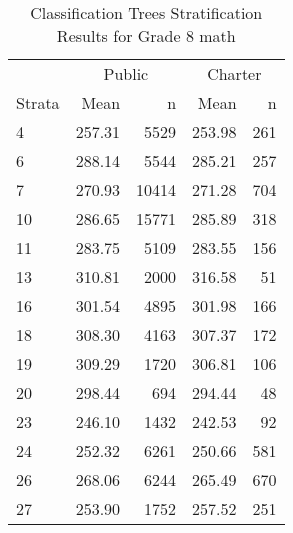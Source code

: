 \begin{table}[ht]
\centering
\caption{Classification Trees Stratification Results for Grade 8 math} 
\label{g8math-circpsa-tree}
\begin{tabular}{lrr@{\extracolsep{.2cm}}rr}
  \hline
   & \multicolumn{2}{c}{Public} & \multicolumn{2}{c}{Charter} \\ \cline{2-3} \cline{4-5} Strata & Mean & n & Mean & n \\ \hline
4 & 257.31 & 5529 & 253.98 & 261 \\ 
  6 & 288.14 & 5544 & 285.21 & 257 \\ 
  7 & 270.93 & 10414 & 271.28 & 704 \\ 
  10 & 286.65 & 15771 & 285.89 & 318 \\ 
  11 & 283.75 & 5109 & 283.55 & 156 \\ 
  13 & 310.81 & 2000 & 316.58 &  51 \\ 
  16 & 301.54 & 4895 & 301.98 & 166 \\ 
  18 & 308.30 & 4163 & 307.37 & 172 \\ 
  19 & 309.29 & 1720 & 306.81 & 106 \\ 
  20 & 298.44 & 694 & 294.44 &  48 \\ 
  23 & 246.10 & 1432 & 242.53 &  92 \\ 
  24 & 252.32 & 6261 & 250.66 & 581 \\ 
  26 & 268.06 & 6244 & 265.49 & 670 \\ 
  27 & 253.90 & 1752 & 257.52 & 251 \\ 
   \hline
\end{tabular}
\end{table}
